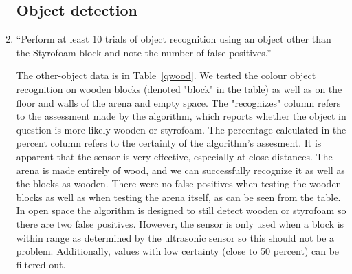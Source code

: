 \documentclass[twocolumn]{article}
\begin{document}
\begin{enumerate}

\subsection{Object detection}

\item
``Perform at least 10 trials of object recognition using an object other than the Styrofoam block and note the number of false positives.\cite{lab5}''

The other-object data is in Table~\ref{qwood}. We tested the colour object recognition on wooden blocks (denoted "block" in the table) as well as on the floor and walls of the arena and empty space. The "recognizes" column refers to the assessment made by the algorithm, which reports whether the object in question is more likely wooden or styrofoam. The percentage calculated in the percent column refers to the certainty of the algorithm's assesment. It is apparent that the sensor is very effective, especially at close distances. The arena is made entirely of wood, and we can successfully recognize it as well as the blocks as wooden. There were no false positives when testing the wooden blocks as well as when testing the arena itself, as can be seen from the table. In open space the algorithm is designed to still detect wooden or styrofoam so there are two false positives. However, the sensor is only used when a block is within range as determined by the ultrasonic sensor so this should not be a problem. Additionally, values with low certainty (close to 50 percent) can be filtered out.


\end{enumerate}
\end{document}
